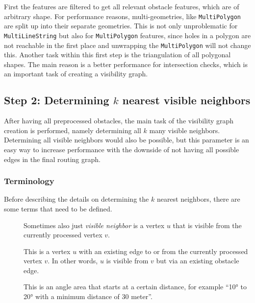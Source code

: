 			First the features are filtered to get all relevant obstacle features, which are of arbitrary shape.
			For performance reasons, multi-geometries, like \texttt{MultiPolygon} are split up into their separate geometries.
			This is not only unproblematic for \texttt{MultiLineString} but also for \texttt{MultiPolygon} features, since holes in a polygon are not reachable in the first place and unwrapping the \texttt{MultiPolygon} will not change this.
			Another task within this first step is the triangulation of all polygonal shapes.
			The main reason is a better performance for intersection checks, which is an important task of creating a visibility graph.
			
	\subsection{Step 2: Determining $k$ nearest visible neighbors}
			
			After having all preprocessed obstacles, the main task of the visibility graph creation is performed, namely determining all $k$ many visible neighbors.
			Determining all visible neighbors would also be possible, but this parameter is an easy way to increase performance with the downside of not having all possible edges in the final routing graph.
			
			\subsubsection{Terminology}
			
				Before describing the details on determining the $k$ nearest neighbors, there are some terms that need to be defined.
				
				\begin{description}
					\item[] Sometimes also just \emph{visible neighbor} is a vertex $u$ that is visible from the currently processed vertex $v$.
					\item[] This is a vertex $u$ with an existing edge to or from the currently processed vertex $v$. In other words, $u$ is visible from $v$ but via an existing obstacle edge.
					\item[] This is an angle area that starts at a certain distance, for example \enquote{10° to 20° with a minimum distance of 30 meter}.
				\end{description}
			
